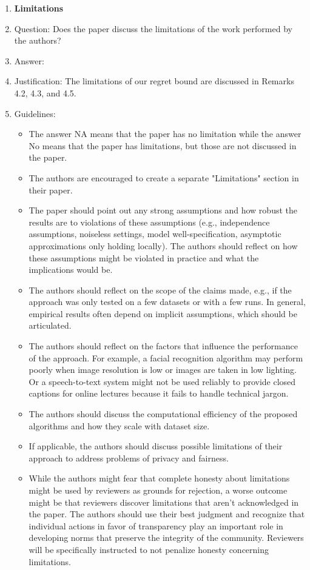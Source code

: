 \documentclass{article}
\theoremstyle{plain}
\theoremstyle{definition}
\theoremstyle{remark}
\begin{document}
\begin{enumerate}
\item {\bf Limitations}
    \item[] Question: Does the paper discuss the limitations of the work performed by the authors?
    \item[] Answer: \answerYes{} %
    \item[] Justification: The limitations of our regret bound are discussed in Remarks 4.2, 4.3, and 4.5.
    \item[] Guidelines:
    \begin{itemize}
        \item The answer NA means that the paper has no limitation while the answer No means that the paper has limitations, but those are not discussed in the paper. 
        \item The authors are encouraged to create a separate "Limitations" section in their paper.
        \item The paper should point out any strong assumptions and how robust the results are to violations of these assumptions (e.g., independence assumptions, noiseless settings, model well-specification, asymptotic approximations only holding locally). The authors should reflect on how these assumptions might be violated in practice and what the implications would be.
        \item The authors should reflect on the scope of the claims made, e.g., if the approach was only tested on a few datasets or with a few runs. In general, empirical results often depend on implicit assumptions, which should be articulated.
        \item The authors should reflect on the factors that influence the performance of the approach. For example, a facial recognition algorithm may perform poorly when image resolution is low or images are taken in low lighting. Or a speech-to-text system might not be used reliably to provide closed captions for online lectures because it fails to handle technical jargon.
        \item The authors should discuss the computational efficiency of the proposed algorithms and how they scale with dataset size.
        \item If applicable, the authors should discuss possible limitations of their approach to address problems of privacy and fairness.
        \item While the authors might fear that complete honesty about limitations might be used by reviewers as grounds for rejection, a worse outcome might be that reviewers discover limitations that aren't acknowledged in the paper. The authors should use their best judgment and recognize that individual actions in favor of transparency play an important role in developing norms that preserve the integrity of the community. Reviewers will be specifically instructed to not penalize honesty concerning limitations.
    \end{itemize}


\end{enumerate}
\end{document}

